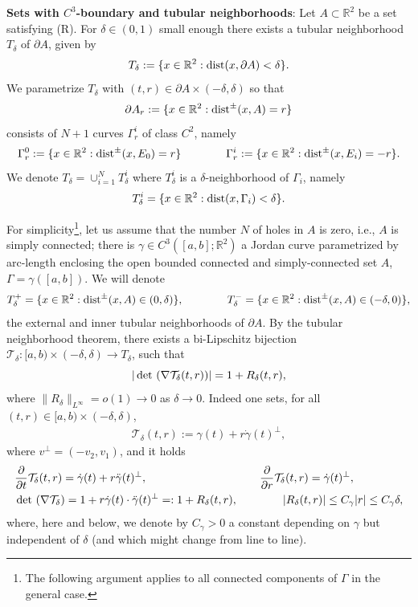 \documentclass[a4paper,11pt]{article}
\numberwithin{equation}{section}
\def\det{\,{\rm det\ }}
\newcommand{\R}{\mathbb{R}}
\begin{document}
\textbf{Sets with $C^3$-boundary and tubular neighborhoods}: 
Let $A\subset\R^2$ be a set satisfying (R). 
 For $\delta\in(0,1)$ small enough there exists a tubular neighborhood $T_\delta$ of $\partial A$, given by 
$$T_\delta:=\{x\in \R^2:\text{{\rm dist}}(x,\partial A)<\delta\}.$$
We parametrize $T_\delta$ with $(t,r)\in \partial A\times (-\delta,\delta)$ so that 
$$\partial A_r:=\{x\in \R^2:\text{{\rm dist}}^\pm(x, A)=r\}$$
consists of $N+1$ curves $\Gamma_r^i$ of class $C^2$, namely
$$\Gamma_r^0:=\{x\in \R^2:\text{{\rm dist}}^\pm(x,E_0)=r\}\qquad \qquad \Gamma_r^i:=\{x\in \R^2:\text{{\rm dist}}^\pm(x,E_i)=-r\}.$$ 
We denote $T_\delta=\cup_{i=1}^NT^i_\delta $ where $T^i_\delta $ is a $\delta$-neighborhood of $\Gamma_i$, namely $$T^i_\delta=\{x\in \R^2:\text{{\rm dist}}(x,\Gamma_i)<\delta\}.$$

For simplicity\footnote{The following argument applies to all connected components of $\Gamma$ in the general case.}, let us assume that the number $N$ of holes in $A$ is zero, i.e., $A$ is simply connected; there is  $\gamma\in C^3([a,b];\R^2)$ a Jordan curve parametrized by arc-length enclosing the open bounded connected and simply-connected set $A$, $\Gamma=\gamma([a,b])$.
We will denote
 $$T^+_\delta=\{x\in \R^2:\text{{\rm dist}}^\pm(x,A)\in (0,\delta)\},\qquad \qquad T^-_\delta=\{x\in \R^2:\text{{\rm dist}}^\pm(x,A)\in (-\delta,0)\},$$
 the external and inner tubular neighborhoods of $\partial A$.
By the tubular neighborhood theorem, there exists a bi-Lipschitz bijection  $\mathcal T_\delta:[a,b)\times (-\delta,\delta)\rightarrow T_\delta$,  such that 
$$|\det(\nabla \mathcal T_\delta(t,r))|=1+R_\delta(t,r),$$
where $\|R_\delta\|_{L^\infty}=o(1)\rightarrow 0$ as $\delta\rightarrow 0$.
Indeed one sets, for all $(t,r)\in [a,b)\times (-\delta,\delta)$,
\begin{align}\label{mathcalTdelta}
	\mathcal T_\delta(t,r):=\gamma(t)+r\dot\gamma(t)^\perp,
\end{align}
where $v^\perp=(-v_2,v_1)$, and it holds 
\begin{align*}
	&\frac{\partial}{\partial t}\mathcal T_\delta(t,r)=\dot\gamma(t)+r\ddot\gamma(t)^\perp,\qquad\qquad\qquad\qquad\qquad\frac{\partial}{\partial r}\mathcal T_\delta(t,r)=\dot\gamma(t)^\perp,\\
	&\det(\nabla \mathcal T_\delta)=1+r\dot\gamma(t)\cdot \ddot \gamma(t)^\perp=:1+R_\delta(t,r),\qquad \qquad |R_\delta(t,r)|\leq C_\gamma|r|\leq C_\gamma\delta,
\end{align*}
where, here and below, we denote by $C_\gamma>0$ a constant  depending  on $\gamma$ but independent of $\delta$ (and which might change from line to line).
\end{document}
